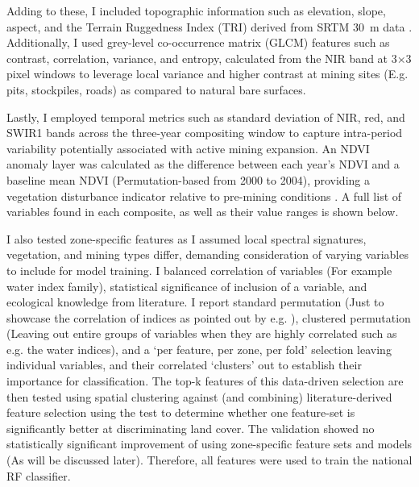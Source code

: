 \documentclass[]{interact}
\begin{document}
Adding to these, I included topographic information such as elevation, slope, aspect, and the Terrain Ruggedness Index (TRI) derived from SRTM 30~m data \citep{farr2007Shuttle,barenblitt2021large,svoboda2022Random}. Additionally, I used grey-level co-occurrence matrix (GLCM) features such as contrast, correlation, variance, and entropy, calculated from the NIR band at 3$\times$3 pixel windows \citep{haralick1973Textural} to leverage local variance and higher contrast at mining sites (E.g. pits, stockpiles, roads) as compared to natural bare surfaces.

Lastly, I employed temporal metrics such as standard deviation of NIR, red, and SWIR1 bands across the three-year compositing window to capture intra-period variability potentially associated with active mining expansion. An NDVI anomaly layer was calculated as the difference between each year's NDVI and a baseline mean NDVI (Permutation-based from 2000 to 2004), providing a vegetation disturbance indicator relative to pre-mining conditions \citep{barenblitt2021large}. A full list of variables found in each composite, as well as their value ranges is shown below.

I also tested zone-specific features as I assumed local spectral signatures, vegetation, and mining types differ, demanding consideration of varying variables to include for model training. I balanced correlation of variables (For example water index family)\citep{hooker2021Unrestricted}, statistical significance of inclusion of a variable, and ecological knowledge from literature. I report standard permutation (Just to showcase the correlation of indices as pointed out by e.g. \citet{hooker2021Unrestricted}), clustered permutation (Leaving out entire groups of variables when they are highly correlated such as e.g. the water indices), and a `per feature, per zone, per fold' selection leaving individual variables, and their correlated `clusters' out to establish their importance for classification. The top-k features of this data-driven selection are then tested using spatial clustering against (and combining) literature-derived feature selection using the \citet{mcnemar1947Note} test to determine whether one feature-set is significantly better at discriminating land cover. The validation showed no statistically significant improvement of using zone-specific feature sets and models (As will be discussed later). Therefore, all features were used to train the national RF classifier.
\end{document}
